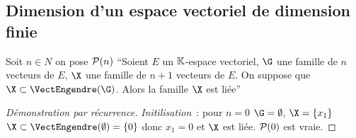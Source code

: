 \subsection{Dimension d'un espace vectoriel de dimension finie}

\begin{lemme}
  Soit $n \in N$ on pose $\P(n)$ ``Soient $E$ un $\K$-espace vectoriel, $\G$ une famille de $n$ vecteurs de $E$, $\X$ une famille de $n+1$ vecteurs de $E$. On suppose que $\X \subset \VectEngendre(\G)$. Alors la famille $\X$ est liée''
\end{lemme}
\begin{proof}[Démonstration par récurrence]
  \emph{Initilisation}~: pour $n=0$ $\G=\emptyset$, $\X=\{x_1\}$ $\X \subset \VectEngendre(\emptyset)=\{0\}$ donc $x_1=0$ et $\X$ est liée. $\P(0)$ est vraie.


\end{proof}
